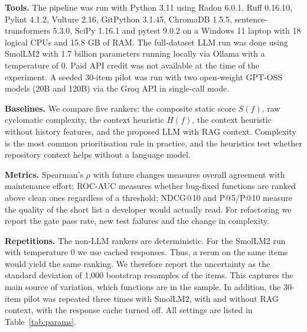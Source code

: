 \documentclass[12pt,onecolumn,draftclsnofoot]{IEEEtran}
\begin{document}
\textbf{Tools.} The pipeline was run with Python 3.11 using Radon 6.0.1, Ruff 0.16.10, Pylint 4.1.2, Vulture 2.16, GitPython 3.1.45, ChromaDB 1.5.5, sentence-transformers 5.3.0, SciPy 1.16.1 and pytest 9.0.2 on a Windows 11 laptop with 18 logical CPUs and 15.8 GB of RAM. The full-dataset LLM run was done using SmolLM2 with 1.7 billion parameters \cite{allal2025smollm2} running locally via Ollama with a temperature of 0. Paid API credit was not available at the time of the experiment. A seeded 30-item pilot was run with two open-weight GPT-OSS models (20B and 120B) via the Groq API in single-call mode.

\textbf{Baselines.} We compare five rankers: the composite static score $S(f)$, raw cyclomatic complexity, the context heuristic $H(f)$, the context heuristic without history features, and the proposed LLM with RAG context. Complexity is the most common prioritisation rule in practice, and the heuristics test whether repository context helps without a language model.

\textbf{Metrics.} Spearman's $\rho$ with future changes measures overall agreement with maintenance effort; ROC-AUC measures whether bug-fixed functions are ranked above clean ones regardless of a threshold; NDCG@10 and P@5/P@10 measure the quality of the short list a developer would actually read. For refactoring we report the gate pass rate, new test failures and the change in complexity.

\textbf{Repetitions.} The non-LLM rankers are deterministic. For the SmolLM2 run with temperature 0 we use cached responses. Thus, a rerun on the same items would yield the same ranking. We therefore report the uncertainty as the standard deviation of 1,000 bootstrap resamples of the items. This captures the main source of variation, which functions are in the sample. In addition, the 30-item pilot was repeated three times with SmolLM2, with and without RAG context, with the response cache turned off. All settings are listed in Table~\ref{tab:params}.
\end{document}

